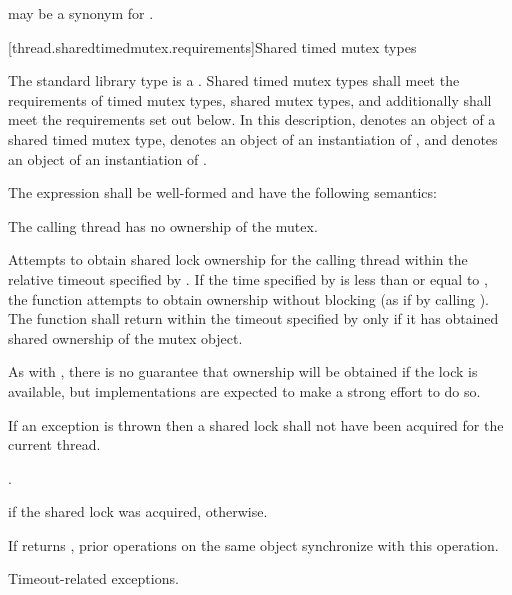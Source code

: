 \pnum
{} may be a synonym for .

[thread.sharedtimedmutex.requirements]{Shared timed mutex types}

\pnum
The standard library type  is a
. Shared timed mutex types shall meet the requirements of
timed mutex types,
shared mutex types, and additionally
shall meet the requirements set out below. In this description,
 denotes an object of a shared timed mutex type,
 denotes an object of an instantiation of
, and
 denotes an object of an instantiation of
.

\pnum
The expression  shall be well-formed and
have the following semantics:

\begin{itemdescr}
\pnum
\requires The calling thread has no ownership of the mutex.

\pnum
\effects
Attempts to obtain
shared lock ownership for the calling thread within the relative
timeout specified by . If the time
specified by  is less than or equal to ,
the function attempts to obtain ownership without blocking (as if by calling
). The function shall return within the timeout
specified by  only if it has obtained shared ownership of the
mutex object.
\begin{note}
As with , there is no guarantee that
ownership will be obtained if the lock is available, but implementations are
expected to make a strong effort to do so.
\end{note}
If an exception is thrown then a shared lock shall not have been acquired for
the current thread.

\pnum
\returntype {}.

\pnum
\returns
{} if the shared lock was acquired,  otherwise.

\pnum
\sync
If  returns , prior
 operations on the same object synchronize
with this operation.

\pnum
\throws
Timeout-related exceptions.
\end{itemdescr}

